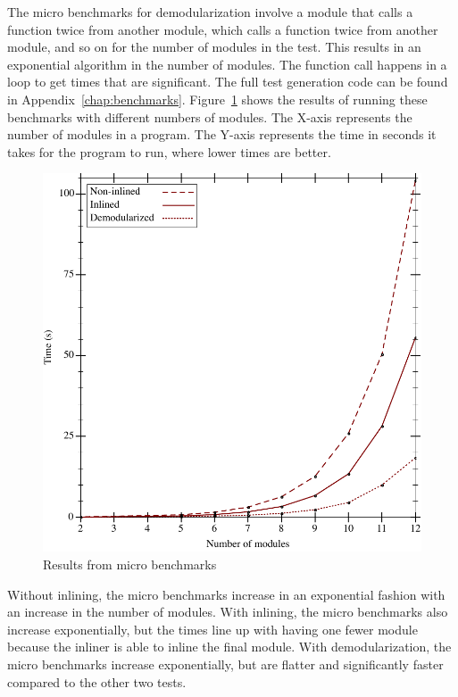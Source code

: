 The micro benchmarks for demodularization involve a module that calls a function twice from another module, which calls a function twice from another module, and so on for the number of modules in the test. 
This results in an exponential algorithm in the number of modules.
The function call happens in a loop to get times that are significant.
The full test generation code can be found in Appendix~\ref{chap:benchmarks}.
Figure~\ref{fig:micro-results} shows the results of running these benchmarks with different numbers of modules.
The X-axis represents the number of modules in a program.
The Y-axis represents the time in seconds it takes for the program to run, where lower times are better.
\begin{figure}
\includegraphics{figures/micro-results}
\caption{Results from micro benchmarks}
\label{fig:micro-results}
\end{figure}
Without inlining, the micro benchmarks increase in an exponential fashion with an increase in the number of modules.
With inlining, the micro benchmarks also increase exponentially, but the times line up with having one fewer module because the inliner is able to inline the final module.
With demodularization, the micro benchmarks increase exponentially, but are flatter and significantly faster compared to the other two tests.

